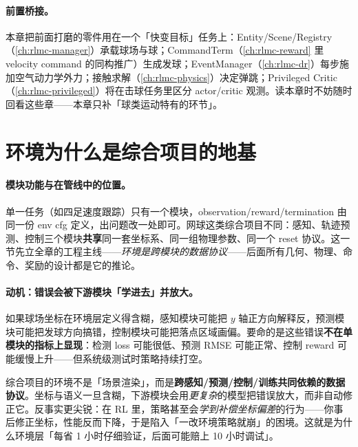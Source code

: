 \paragraph{前置桥接。}本章把前面打磨的零件用在一个「快变目标」任务上：Entity/Scene/Registry（\cref{ch:rlmc-manager}）承载球场与球；CommandTerm（\cref{ch:rlmc-reward} 里 velocity command 的同构推广）生成发球；EventManager（\cref{ch:rlmc-dr}）每步施加空气动力学外力；接触求解（\cref{ch:rlmc-physics}）决定弹跳；Privileged Critic（\cref{ch:rlmc-privileged}）将在击球任务里区分 actor/critic 观测。读本章时不妨随时回看这些章——本章只补「球类运动特有的环节」。

\section{环境为什么是综合项目的地基}
\label{sec:rlmc-tennis-contract}

\paragraph{模块功能与在管线中的位置。}单一任务（如四足速度跟踪）只有一个模块，observation/reward/termination 由同一份 env cfg 定义，出问题改一处即可。网球这类综合项目不同：感知、轨迹预测、控制三个模块\textbf{共享}同一套坐标系、同一组物理参数、同一个 reset 协议。这一节先立全章的工程主线——\emph{环境是跨模块的数据协议}——后面所有几何、物理、命令、奖励的设计都是它的推论。

\paragraph{动机：错误会被下游模块「学进去」并放大。}如果球场坐标在环境层定义得含糊，感知模块可能把 $y$ 轴正方向解释反，预测模块可能把发球方向搞错，控制模块可能把落点区域画偏。要命的是这些错误\textbf{不在单模块的指标上显现}：检测 loss 可能很低、预测 RMSE 可能正常、控制 reward 可能缓慢上升——但系统级测试时策略持续打空。

\begin{insight}[环境是综合项目里杠杆效应最大的一层]\label{ins:rlmc-tennis-contract}
综合项目的环境不是「场景渲染」，而是\textbf{跨感知/预测/控制/训练共同依赖的数据协议}。坐标与语义一旦含糊，下游模块会用\emph{更复杂}的模型把错误放大，而非自动修正它。反事实更尖锐：在 RL 里，策略甚至会\emph{学到补偿坐标偏差}的行为——你事后修正坐标，性能反而下降，于是陷入「一改环境策略就崩」的困境。这就是为什么环境层「每省 1 小时仔细验证，后面可能赔上 10 小时调试」。
\end{insight}

